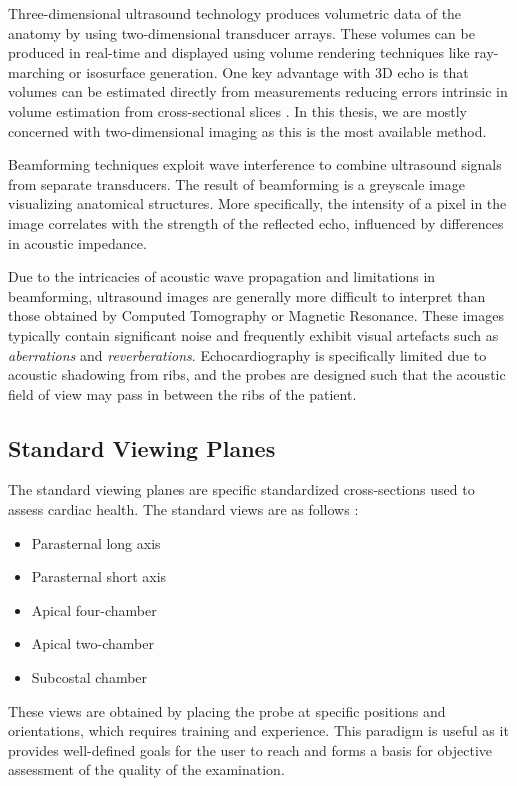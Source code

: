 \documentclass{article}
\begin{document}
Three-dimensional ultrasound technology produces volumetric data of the anatomy by using two-dimensional transducer arrays.
These volumes can be produced in real-time and displayed using volume rendering techniques like ray-marching or isosurface generation. One key advantage with 3D echo
is that volumes can be estimated directly from measurements reducing errors intrinsic in volume estimation from cross-sectional slices \cite{Shah2013}.
In this thesis, we are mostly concerned with two-dimensional imaging as this is the most available method.

Beamforming techniques exploit wave interference to combine ultrasound signals from separate transducers. The result of beamforming is a
greyscale image visualizing anatomical structures. More specifically, the intensity of a pixel in the image correlates with the strength of the reflected echo, influenced by differences
in acoustic impedance.

Due to the intricacies of acoustic wave propagation and limitations in beamforming, ultrasound images are generally more difficult to interpret than those obtained by Computed Tomography or Magnetic Resonance.
These images typically contain significant noise and frequently exhibit visual artefacts such as \textit{aberrations} and \textit{reverberations}. Echocardiography is specifically limited due to 
acoustic shadowing from ribs, and the probes are designed such that the acoustic field of view may pass in between the ribs of the patient.

\subsection{Standard Viewing Planes}
The standard viewing planes are specific standardized cross-sections used to assess cardiac health.
The standard views are as follows \cite{otto2018echocardiography}:
\begin{itemize}
    \item Parasternal long axis
    \item Parasternal short axis
    \item Apical four-chamber
    \item Apical two-chamber
    \item Subcostal chamber
\end{itemize}

These views are obtained by placing the probe at specific positions and orientations, which requires
training and experience. This paradigm is useful as it provides well-defined goals
for the user to reach and forms a basis for objective assessment of the quality of the examination.
\end{document}
